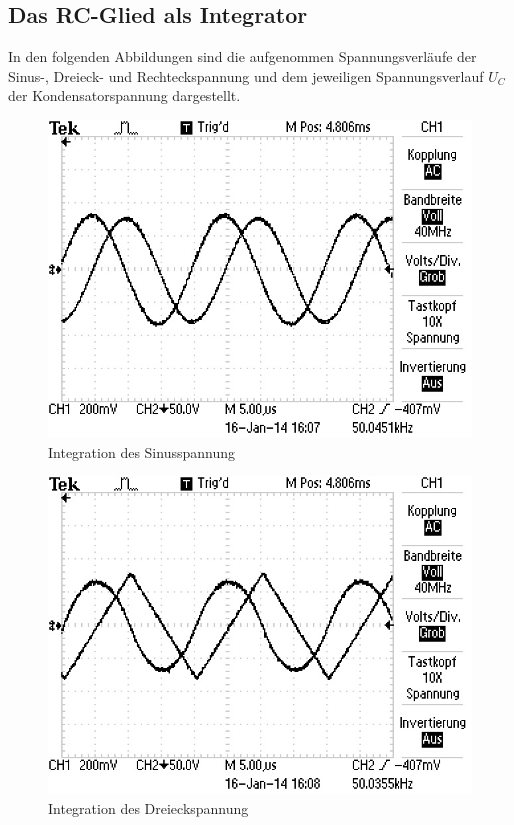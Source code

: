 \subsection{Das RC-Glied als Integrator}
\label{sec:Auswertung_Integrator}
	In den folgenden Abbildungen sind die aufgenommen Spannungsverläufe der Sinus-, Dreieck- und Rechteckspannung
	und dem jeweiligen Spannungsverlauf $U_{C}$ der Kondensatorspannung dargestellt.
	
	\begin{figure}[!h]
		\centering
		\includegraphics[scale=0.8]{Grafiken/Integrator_Sinus.jpg}
		\caption{Integration des Sinusspannung}
		\label{fig:Auswertung_Integrator_Sinus}
	\end{figure}
	
	\begin{figure}[!h]
		\centering
		\includegraphics[scale=0.8]{Grafiken/Integrator_Dreieck.jpg}
		\caption{Integration des Dreieckspannung}
		\label{fig:Auswertung_Integrator_Dreieck}
	\end{figure}
	
